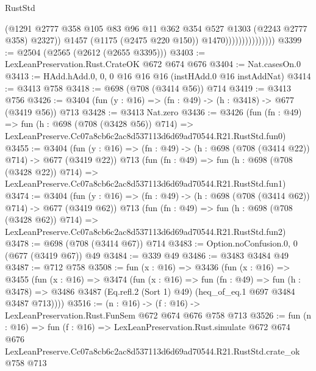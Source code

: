 \begin{lexlean}{RustStd}
\begin{coremodule}
                                    (@1291
                                      @2777
                                      @358
                                      @105
                                      @83
                                      @96
                                      @11
                                      @362
                                      @354
                                      @527
                                      @1303
                                      (@2243 @2777 @358)
                                      @2327))
                                  @1457
                                  (@1175 (@2475 @220 @150))
                                  @1470)))))))))))))))
@3399 := @2504 (@2565 (@2612 (@2655 @3395)))
@3403 := LexLeanPreservation.Rust.CrateOK @672 @674 @676
@3404 := Nat.casesOn.{0}
@3413 := HAdd.hAdd.{0, 0, 0} @16 @16 @16 (instHAdd.{0} @16 instAddNat)
@3414 := @3413 @758
@3418 := @698 (@708 (@3414 @56)) @714
@3419 := @3413 @756
@3426 := @3404 (fun (y : @16) => (fn : @49) -> (h : @3418) -> @677 (@3419 @56)) @713
@3428 := @3413 Nat.zero
@3436 := @3426
    (fun (fn : @49) =>
    fun (h : @698 (@708 (@3428 @56)) @714) =>
    LexLeanPreserve.Cc07a8cb6c2ac8d537113d6d69ad70544.R21.RustStd.fun0)
@3455 := @3404
    (fun (y : @16) => (fn : @49) -> (h : @698 (@708 (@3414 @22)) @714) -> @677 (@3419 @22))
    @713
    (fun (fn : @49) =>
    fun (h : @698 (@708 (@3428 @22)) @714) =>
    LexLeanPreserve.Cc07a8cb6c2ac8d537113d6d69ad70544.R21.RustStd.fun1)
@3474 := @3404
    (fun (y : @16) => (fn : @49) -> (h : @698 (@708 (@3414 @62)) @714) -> @677 (@3419 @62))
    @713
    (fun (fn : @49) =>
    fun (h : @698 (@708 (@3428 @62)) @714) =>
    LexLeanPreserve.Cc07a8cb6c2ac8d537113d6d69ad70544.R21.RustStd.fun2)
@3478 := @698 (@708 (@3414 @67)) @714
@3483 := Option.noConfusion.{0, 0} (@677 (@3419 @67)) @49
@3484 := @339 @49
@3486 := @3483 @3484 @49
@3487 := @712 @758
@3508 := fun (x : @16) =>
  @3436
    (fun (x : @16) =>
    @3455
      (fun (x : @16) =>
      @3474
        (fun (x : @16) =>
        fun (fn : @49) =>
        fun (h : @3478) =>
        @3486 @3487 (Eq.refl.{2} (Sort 1) @49) (heq_of_eq.{1} @697 @3484 @3487 @713))))
@3516 := (n : @16) -> (f : @16) -> LexLeanPreservation.Rust.FunSem @672 @674 @676 @758 @713
@3526 := fun (n : @16) =>
  fun (f : @16) =>
  LexLeanPreservation.Rust.simulate
    @672
    @674
    @676
    LexLeanPreserve.Cc07a8cb6c2ac8d537113d6d69ad70544.R21.RustStd.crate_ok
    @758
    @713
\end{coremodule}
\end{lexlean}
